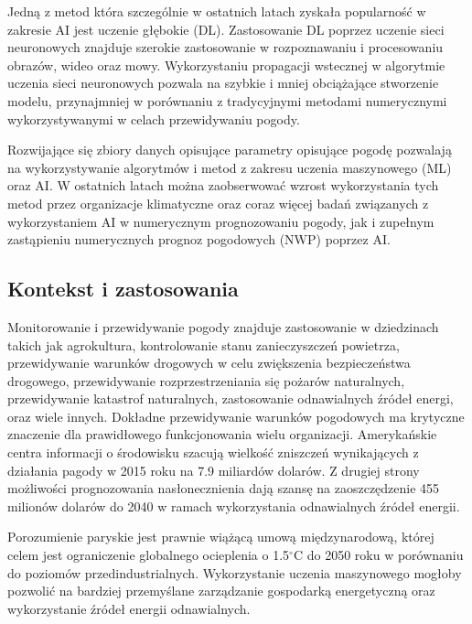 Jedną z metod która szczególnie w ostatnich latach zyskała popularność w zakresie
AI jest uczenie głębokie (DL). Zastosowanie DL poprzez uczenie sieci neuronowych
znajduje szerokie zastosowanie w rozpoznawaniu i procesowaniu obrazów, wideo oraz
mowy. Wykorzystaniu propagacji wstecznej w algorytmie uczenia sieci neuronowych
pozwala na szybkie i mniej obciążające stworzenie modelu, przynajmniej w porównaniu
z tradycyjnymi metodami numerycznymi wykorzystywanymi w celach przewidywaniu pogody.

Rozwijające się zbiory danych opisujące parametry opisujące pogodę 
pozwalają na wykorzystywanie algorytmów i metod z zakresu uczenia maszynowego (ML)
oraz AI. W ostatnich latach można zaobserwować wzrost wykorzystania tych metod
przez organizacje klimatyczne oraz coraz więcej badań związanych z wykorzystaniem
AI w numerycznym prognozowaniu pogody, jak i zupełnym zastąpieniu numerycznych
prognoz pogodowych (NWP) poprzez 
AI.

\subsection{Kontekst i zastosowania}

Monitorowanie i przewidywanie pogody znajduje zastosowanie w dziedzinach takich
jak agrokultura, kontrolowanie stanu zanieczyszczeń powietrza, 
przewidywanie warunków drogowych w celu zwiększenia bezpieczeństwa drogowego,
przewidywanie rozprzestrzeniania się pożarów naturalnych,
przewidywanie katastrof naturalnych, zastosowanie odnawialnych źródeł energi,
oraz wiele innych. Dokładne przewidywanie warunków pogodowych ma krytyczne znaczenie
dla prawidłowego funkcjonowania wielu organizacji. Amerykańskie centra
informacji o środowisku szacują wielkość zniszczeń wynikających z działania
pagody w 2015 roku na 7.9 miliardów dolarów\cite{using-artificial-intelligence-to-improve}.
Z drugiej strony możliwości prognozowania nasłonecznienia dają szansę na zaoszczędzenie
455 milionów dolarów do 2040 w ramach wykorzystania odnawialnych źródeł energii.

Porozumienie paryskie jest prawnie wiążącą umową międzynarodową,
której celem jest ograniczenie globalnego ocieplenia o 1.5$^{\circ}$C
do 2050 roku w porównaniu do poziomów przedindustrialnych. Wykorzystanie
uczenia maszynowego mogłoby pozwolić na bardziej przemyślane zarządzanie
gospodarką energetyczną oraz wykorzystanie źródeł energii odnawialnych.

